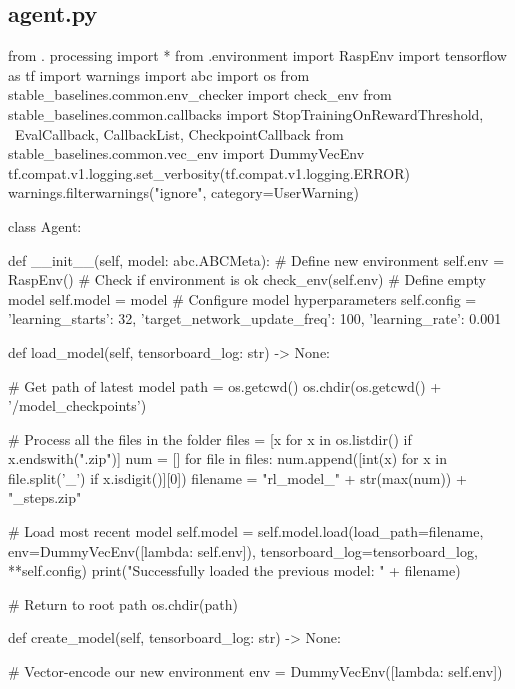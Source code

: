 \subsection{agent.py}
\label{agent}
\begin{pyverbatim}
from . processing import *
from .environment import RaspEnv
import tensorflow as tf
import warnings
import abc
import os
from stable_baselines.common.env_checker import check_env
from stable_baselines.common.callbacks import StopTrainingOnRewardThreshold,  \
EvalCallback, CallbackList, CheckpointCallback
from stable_baselines.common.vec_env import DummyVecEnv
tf.compat.v1.logging.set_verbosity(tf.compat.v1.logging.ERROR)
warnings.filterwarnings("ignore", category=UserWarning)


class Agent:

    def __init__(self, model: abc.ABCMeta):
        # Define new environment
        self.env = RaspEnv()
        # Check if environment is ok
        check_env(self.env)
        # Define empty model
        self.model = model
        # Configure model hyperparameters
        self.config = {'learning_starts': 32, 
                       'target_network_update_freq': 100, 
                       'learning_rate': 0.001}

    def load_model(self, tensorboard_log: str) -> None:

        # Get path of latest model
        path = os.getcwd()
        os.chdir(os.getcwd() + '/model_checkpoints')

        # Process all the files in the folder
        files = [x for x in os.listdir() if x.endswith(".zip")]
        num = []
        for file in files:
            num.append([int(x) for x in file.split('_') if x.isdigit()][0])
        filename = "rl_model_" + str(max(num)) + "_steps.zip"

        # Load most recent model
        self.model = self.model.load(load_path=filename,
                                     env=DummyVecEnv([lambda: self.env]),
                                     tensorboard_log=tensorboard_log,
                                     **self.config)
        print("Successfully loaded the previous model: " + filename)

        # Return to root path
        os.chdir(path)

    def create_model(self, tensorboard_log: str) -> None:

        # Vector-encode our new environment
        env = DummyVecEnv([lambda: self.env])


\end{pyverbatim}
